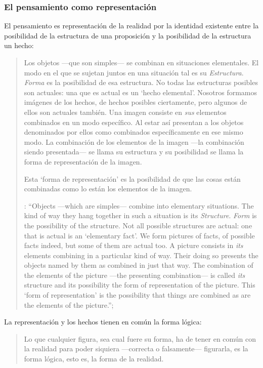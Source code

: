 \subsubsection{El pensamiento como representación}

El pensamiento es representación de la realidad por la identidad existente entre la posibilidad de la estructura de una proposición y la posibilidad de la estructura un hecho: \blockquote[{\cite[171]{anscombe2011plato:simplicity}}: \enquote{Objects ---which are simples--- combine into elementary situations. The kind of way they hang together in such a situation is its \emph{Structure}. \emph{Form} is the possibility of the structure. Not all possible structures are actual: one that is actual is an `elementary fact'. We form pictures of facts, of possible facts indeed, but some of them are actual too. A picture consists in \emph{its} elements combining in a particular kind of way. Their doing so presents the objects named by them as combined in just that way. The combination of the elements of the picture ---the presenting combination--- is called \emph{its} structure and its possibility the form of representation of the picture. This `form of representation' is the possibility that things are combined as are the elements of the picture.}; {\cite[Cf.~][\S2.15]{wittgenstein1922tractatuses}}]{Los objetos ---que son simples--- se combinan en situaciones elementales. El modo en el que se sujetan juntos en una situación tal es su \emph{Estructura}. \emph{Forma} es la posibilidad de esa estructura. No todas las estructuras posibles son actuales: una que es actual es un `hecho elemental'. Nosotros formamos imágenes de los hechos, de hechos posibles ciertamente, pero algunos de ellos son actuales también. Una imagen consiste en \emph{sus} elementos combinados en un modo específico. Al estar así presentan a los objetos denominados por ellos como combinados específicamente en ese mismo modo. La combinación de los elementos de la imagen ---la combinación siendo presentada--- se llama su estructura y su posibilidad se llama la forma de representación de la imagen.

Esta `forma de representación' es la posibilidad de que las cosas están combinadas como lo están los elementos de la imagen.}

La representación y los hechos tienen en común la forma lógica: \blockquote[{\cite[\S2.18]{wittgenstein1922tractatuses}}]{Lo que cualquier figura, sea cual fuere su forma, ha de tener en común con la realidad para poder siquiera ---correcta o falsamente--- figurarla, es la forma lógica, esto es, la forma de la realidad.}

